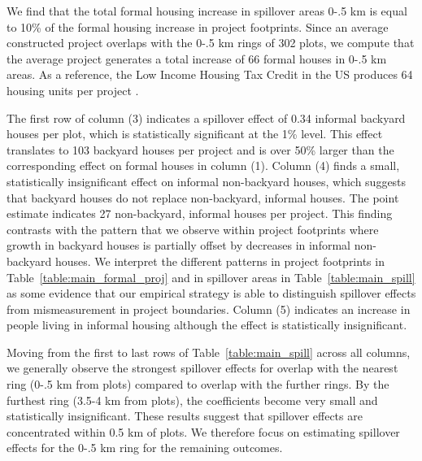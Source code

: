 \documentclass[12pt]{article}
\newcommand{\rv}{}
\begin{document}
\rv{We find that the total formal housing increase in spillover areas 0-.5 km is equal to 10\% of the formal housing increase in project footprints.  Since an average constructed project overlaps with the 0-.5 km rings of 302 plots, we compute that the average project generates a total increase of 66 formal houses in 0-.5 km areas.  As a reference, the Low Income Housing Tax Credit in the US produces 64 housing units per project \citep{diamond2019wants}.}

\rv{The first row of column (3) indicates a spillover effect of 0.34 informal backyard houses per plot, which is statistically significant at the 1\% level.  This effect translates to 103 backyard houses per project and is over 50\% larger than the corresponding effect on formal houses in column (1).  Column (4) finds a small, statistically insignificant effect on informal non-backyard houses, which suggests that backyard houses do not replace non-backyard, informal houses.  The point estimate indicates 27 non-backyard, informal houses per project.  This finding contrasts with the pattern that we observe within project footprints where growth in backyard houses is partially offset by decreases in informal non-backyard houses.  We interpret the different patterns in project footprints in Table~\ref{table:main_formal_proj} and in spillover areas in Table~\ref{table:main_spill} as some evidence that our empirical strategy is able to distinguish spillover effects from mismeasurement in project boundaries.  Column (5) indicates an increase in people living in informal housing although the effect is statistically insignificant.}

\rv{Moving from the first to last rows of Table~\ref{table:main_spill} across all columns, we generally observe the strongest spillover effects for overlap with the nearest ring (0-.5 km from plots) compared to overlap with the further rings.  By the furthest ring (3.5-4 km from plots), the coefficients become very small and statistically insignificant.  These results suggest that spillover effects are concentrated within 0.5 km of plots.  We therefore focus on estimating spillover effects for the 0-.5 km ring for the remaining outcomes.}

\end{document}
